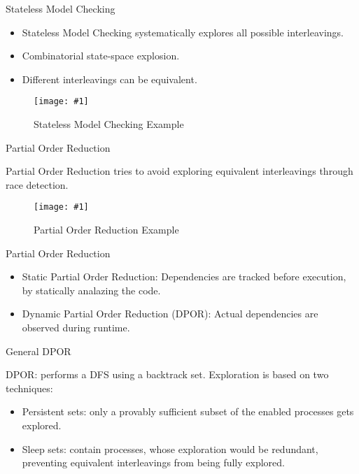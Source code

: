 \documentclass[9pt]{beamer}
\newcommand{\trace}[2]{
\begin{figure}[H]
\centering
\texttt{[image: \#1]}
\caption{#2}
\label{#2}
\end{figure}
}
\newcommand{\tracelong}[2]{
\begin{figure}[H]
\centering
\texttt{[image: \#1]}
\caption{#2}
\label{#2}
\end{figure}
}
\begin{document}
\begin{frame} {Stateless Model Checking}

\begin{itemize}[<+->]
    \item Stateless Model Checking systematically explores all possible interleavings.
    \item Combinatorial state-space explosion.
    \item Different interleavings can be equivalent.
\end{itemize}
\pause
\tracelong{../img/initstateless.png}{Stateless Model Checking Example}

\end{frame}

\begin{frame} {Partial Order Reduction}

Partial Order Reduction tries to avoid exploring equivalent interleavings through race detection.

\trace{../img/initpor.png}{Partial Order Reduction Example}

\end{frame}

\begin{frame} {Partial Order Reduction}
\begin{itemize}[<+->]
    \item Static Partial Order Reduction: Dependencies are tracked before execution, by statically analazing the code.
    \item Dynamic Partial Order Reduction (DPOR): Actual dependencies are observed during runtime.
\end{itemize}

\end{frame}

\begin{frame} {General DPOR}

DPOR: performs a DFS using a backtrack set. Exploration is based on two techniques:
\begin{itemize}[<+->]
    \item Persistent sets: only a provably sufficient subset of the enabled processes gets explored.
    \item Sleep sets: contain processes, whose exploration would be redundant, 
    preventing equivalent interleavings from being fully explored.
\end{itemize}

\end{frame}
\end{document}
